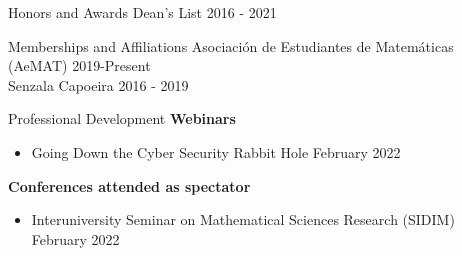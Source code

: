 \documentclass{resume} %
\begin{document}
\begin{rSection}{Honors and Awards}
    Dean's List \hfill{2016 - 2021}
\end{rSection}

\begin{rSection}{Memberships and Affiliations}
    Asociaci\'on de Estudiantes de Matem\'aticas (AeMAT) \hfill{2019-Present} \\
    Senzala Capoeira \hfill{2016 - 2019} \\
\end{rSection}


\begin{rSection}{Professional Development}
    \textbf{Webinars}
    \begin{itemize}
        \item Going Down the Cyber Security Rabbit Hole \hfill{February 2022}
    \end{itemize}
    \textbf{Conferences attended as spectator}
    \begin{itemize}
        \item Interuniversity Seminar on Mathematical Sciences Research (SIDIM)
        \hfill{February 2022}
    \end{itemize}

\end{rSection}
\end{document}

